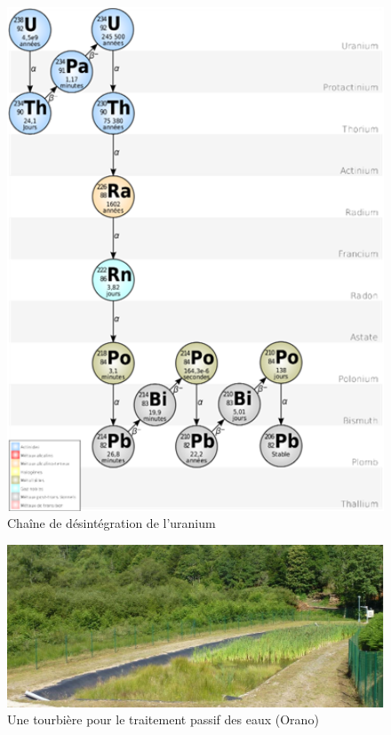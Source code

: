 \documentclass{article}
\begin{document}
\begin{figure}[H]
    \centering
    \includegraphics[width=13cm]{II_A2_1.png}
    \caption{Chaîne de désintégration de l’uranium}
    \label{fig:desintegration_uranium}
\end{figure}
\newpage

\begin{figure}[H]
\centering
\includegraphics[width=0.65\linewidth]{III_A_4.png}
\caption{Une tourbière pour le traitement passif des eaux (Orano)}
\label{fig:tourbiere}
\end{figure}

\end{document}
